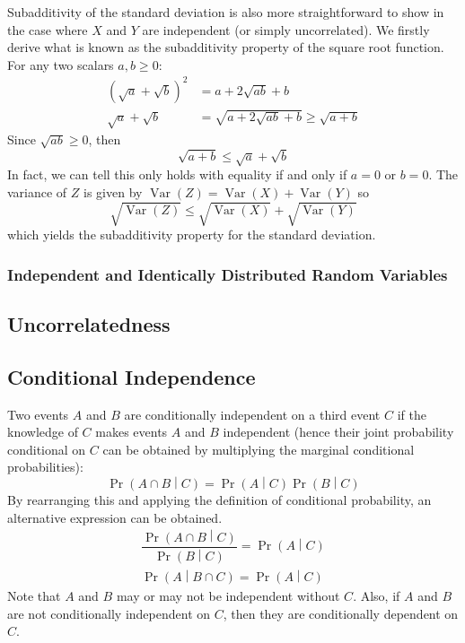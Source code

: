 \documentclass[11pt]{report} %
\begin{document}
Subadditivity of the standard deviation is also more straightforward to show in the case where $X$ and $Y$ are independent (or simply uncorrelated). We firstly derive what is known as the subadditivity property of the square root function. For any two scalars $a, b \geq 0$:
\begin{align}
\left(\sqrt{a} + \sqrt{b}\right)^{2} &= a + 2\sqrt{ab} + b \\
\sqrt{a} + \sqrt{b} &= \sqrt{a + 2\sqrt{ab} + b} \geq \sqrt{a + b}
\end{align}
Since $\sqrt{ab} \geq 0$, then
\begin{equation}
\sqrt{a + b} \leq \sqrt{a} + \sqrt{b}
\end{equation}
In fact, we can tell this only holds with equality if and only if $a = 0$ or $b = 0$. The variance of $Z$ is given by $\operatorname{Var}\left(Z\right) = \operatorname{Var}\left(X\right) + \operatorname{Var}\left(Y\right)$ so
\begin{equation}
\sqrt{\operatorname{Var}\left(Z\right)} \leq \sqrt{\operatorname{Var}\left(X\right)} + \sqrt{\operatorname{Var}\left(Y\right)}
\end{equation}
which yields the subadditivity property for the standard deviation.

\subsubsection{Independent and Identically Distributed Random Variables}


\subsection{Uncorrelatedness}


\subsection{Conditional Independence}

Two events $A$ and $B$ are conditionally independent on a third event $C$ if the knowledge of $C$ makes events $A$ and $B$ independent (hence their joint probability conditional on $C$ can be obtained by multiplying the marginal conditional probabilities):
\begin{equation}
\operatorname{Pr}\left(A\cap B\middle|C\right) = \operatorname{Pr}\left(A\middle|C\right)\operatorname{Pr}\left(B\middle|C\right)
\end{equation}
By rearranging this and applying the definition of conditional probability, an alternative expression can be obtained.
\begin{gather}
\dfrac{\operatorname{Pr}\left(A\cap B\middle|C\right)}{\operatorname{Pr}\left(B\middle|C\right)} = \operatorname{Pr}\left(A\middle|C\right) \\
\operatorname{Pr}\left(A\middle|B \cap C\right) = \operatorname{Pr}\left(A\middle|C\right)
\end{gather}
Note that $A$ and $B$ may or may not be independent without $C$. Also, if $A$ and $B$ are not conditionally independent on $C$, then they are conditionally dependent on $C$. \\
\end{document}
